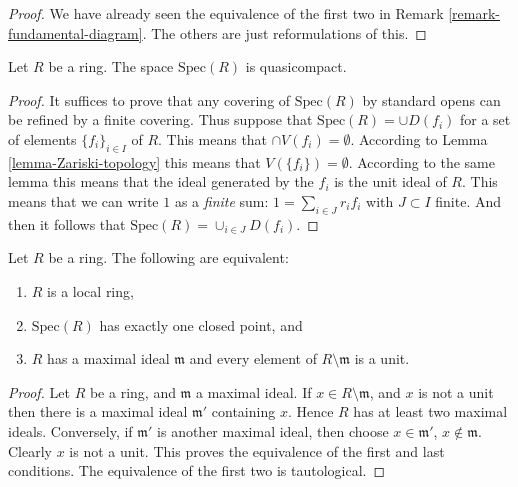 \begin{proof}
We have already seen the equivalence of the first two
in Remark \ref{remark-fundamental-diagram}. The others
are just reformulations of this.
\end{proof}

\begin{lemma}
\label{lemma-quasicompact}
Let $R$ be a ring. The space $\text{Spec}(R)$ is quasicompact.
\end{lemma}

\begin{proof}
It suffices to prove that any covering of $\text{Spec}(R)$
by standard opens can be refined by a finite covering.
Thus suppose that $\text{Spec}(R) = \cup D(f_i)$
for a set of elements $\{f_i\}_{i\in I}$ of $R$. This means that
$\cap V(f_i) = \emptyset$. According to Lemma
\ref{lemma-Zariski-topology} this means that
$V(\{f_i \}) = \emptyset$. According to the
same lemma this means that the ideal generated
by the $f_i$ is the unit ideal of $R$. This means
that we can write $1$ as a {\it finite} sum:
$1 = \sum_{i \in J} r_i f_i$ with $J \subset I$ finite.
And then it follows that $\text{Spec}(R)
= \cup_{i \in J} D(f_i)$.
\end{proof}


\begin{lemma}
\label{lemma-characterize-local-ring}
Let $R$ be a ring. The following are equivalent:
\begin{enumerate}
\item $R$ is a local ring,
\item $\text{Spec}(R)$ has exactly one closed point, and
\item $R$ has a maximal ideal $\mathfrak m$
and every element of $R \setminus \mathfrak m$
is a unit.
\end{enumerate}
\end{lemma}

\begin{proof}
Let $R$ be a ring, and $\mathfrak m$ a maximal ideal.
If $x \in R \setminus \mathfrak m$, and $x$ is not a unit
then there is a maximal ideal $\mathfrak m'$ containing
$x$. Hence $R$ has at least two maximal ideals. Conversely,
if $\mathfrak m'$ is another maximal ideal, then choose
$x \in \mathfrak m'$, $x \not \in \mathfrak m$. Clearly
$x$ is not a unit. This proves the equivalence of the
first and last conditions. The equivalence of the first
two is tautological.
\end{proof}



